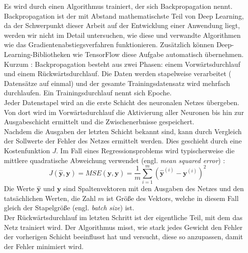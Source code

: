 Es wird durch einen Algorithmus trainiert, der
sich Backpropagation nennt.
Backpropagation ist der mit Abstand mathematischste Teil von
Deep Learning, da der Schwerpunkt dieser Arbeit auf der Entwicklung einer
Anwendung liegt, werden wir nicht im Detail untersuchen,
wie diese und verwandte Algorithmen wie das Gradientenabstiegsverfahren
funktionieren. Zusätzlich können Deep-Learning-Bibliotheken
wie TensorFlow diese Aufgabe automatisch übernehmen.\\[8pt]
Kurzum \parencite[290-291]{book:hands-on-ml}:
Backpropagation besteht aus zwei Phasen: einem Vorwärtsdurchlauf
und einem Rückwärtsdurchlauf. Die Daten werden stapelweise verarbeitet
( Datensätze auf ein­mal) und der gesamte Trainingsdatensatz
wird mehrfach durchlaufen. Ein Trainingsdurchlauf nennt sich Epoche.\\[4pt]
Jeder Datenstapel wird an die erste Schicht des neuronalen Netzes
übergeben. Von dort wird im Vorwärtsdurchlauf die Aktivierung aller
Neuronen bis hin zur Ausgabeschicht ermittelt und die Zwischenerbnisse gespeichert.\\[4pt]
Nachdem die Ausgaben der letzten Schicht bekannt sind, kann
durch Vergleich der Sollwerte der Fehler des Netzes ermittelt werden.
Dies geschieht durch eine Kostenfunktion $J$. Im Fall eines Regressionsproblems
wird typischerweise die mittlere quadratische Abweichung verwendet
(engl. \textit{mean squared error}) \parencite[113-114]{book:hands-on-ml}:
\begin{equation}
  J(\mathbf{\hat{y}}, \mathbf{y}) =
  MSE(\mathbf{\hat{y}}, \mathbf{y}) =
    \frac{1}{m} \sum_{i=1}^{m} (\mathbf{\hat{y}}^{(i)} - \mathbf{y}^{(i)})^2
\end{equation}
Die Werte $\mathbf{\hat{y}}$ und $\mathbf{y}$ sind Spaltenvektoren
mit den Ausgaben des Netzes und den tatsächlichen Werten, die Zahl $m$
ist Größe des Vektors, welche in diesem Fall gleich der Stapelgröße
(engl. \textit{batch size}) ist.\\[4pt]
Der Rückwärtsdurchlauf im letzten Schritt ist der eigentliche Teil, mit dem das Netz
trainiert wird. Der Algorithmus misst, wie stark jedes Gewicht den Fehler der
vorherigen Schicht beeinflusst hat und versucht, diese so anzupassen,
damit der Fehler minimiert wird.